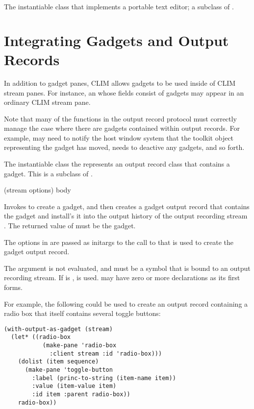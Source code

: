 The instantiable class that implements a portable text editor; a subclass of
.


\section {Integrating Gadgets and Output Records}

In addition to gadget panes, CLIM allows gadgets to be used inside of CLIM
stream panes.  For instance, an  whose fields consist of
gadgets may appear in an ordinary CLIM stream pane.

Note that many of the functions in the output record protocol must correctly
manage the case where there are gadgets contained within output records.  For
example,  may need to notify the host window
system that the toolkit object representing the gadget has moved,
 needs to deactive any gadgets, and so forth.


The instantiable class the represents an output record class that contains a
gadget.  This is a subclass of .

 {(stream \rest options) \body body}

Invokes  to create a gadget, and then creates a gadget output record
that contains the gadget and install's it into the output history of the output
recording stream .  The returned value of  must be the
gadget.

The options in  are passed as initargs to the call to
 that is used to create the gadget output
record.

The  argument is not evaluated, and must be a symbol that is bound to
an output recording stream.  If  is ,  is
used.   may have zero or more declarations as its first forms.

For example, the following could be used to create an output record containing a
radio box that itself contains several toggle buttons:

\begin{verbatim}
(with-output-as-gadget (stream)
  (let* ((radio-box
           (make-pane 'radio-box
             :client stream :id 'radio-box)))
    (dolist (item sequence)
      (make-pane 'toggle-button
        :label (princ-to-string (item-name item))
        :value (item-value item)
        :id item :parent radio-box))
    radio-box))
\end{verbatim}

